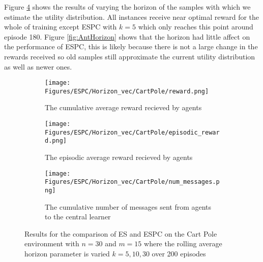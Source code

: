 Figure \ref{fig:CPHorizon} shows the results of varying the horizon of the samples with which we estimate the utility distribution. All instances receive near optimal reward for the whole of training except ESPC with $k=5$ which only reaches this point around episode 180.
Figure \ref{fig:AntHorizon} shows that the horizon had little affect on the performance of ESPC, this is likely because there is not a large change in the rewards received so old samples still approximate the current utility distribution as well as newer ones.

\begin{figure}
    \centering
    \begin{subfigure}{0.5\textwidth}
        \centering
        \texttt{[image: Figures/ESPC/Horizon\_vec/CartPole/reward.png]}
        \caption{The cumulative average reward recieved by agents}
        \label{fig:HorizonReward}
    \end{subfigure}
    \begin{subfigure}{0.5\textwidth}
        \centering
        \texttt{[image: Figures/ESPC/Horizon\_vec/CartPole/episodic\_reward.png]}
        \caption{The episodic average reward recieved by agents}
        \label{fig:HorizonEpisodicReward}
    \end{subfigure}
    \begin{subfigure}{0.5\textwidth}
        \centering
        \texttt{[image: Figures/ESPC/Horizon\_vec/CartPole/num\_messages.png]}
        \caption{The cumulative number of messages sent from agents to the central learner}
        \label{fig:HorizonMessages}
    \end{subfigure}
    \caption{Results for the comparison of ES and ESPC on the Cart Pole environment with $n=30$ and $m=15$ where the rolling average horizon parameter is varied $k=5,10,30$ over 200 episodes}
    \label{fig:CPHorizon}
\end{figure}

